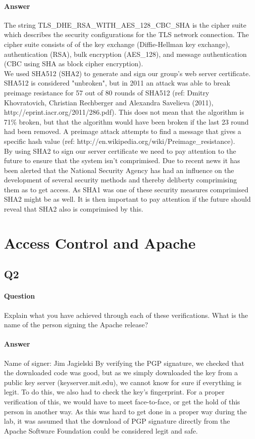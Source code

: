 \documentclass[11pt, a4paper]{article}
\begin{document}
\paragraph{Answer}
The string TLS\_DHE\_RSA\_WITH\_AES\_128\_CBC\_SHA is the cipher suite which describes the security configurations for the TLS network connection. The cipher suite consists of of the key exchange (Diffie-Hellman key exchange), authentication (RSA), bulk encryption (AES\_128), and message authentication (CBC using SHA as block cipher encryption). \\

We used SHA512 (SHA2) to generate and sign our group's web server certificate. SHA512 is considered "unbroken", but in 2011 an attack was able to break preimage resistance  for 57 out of 80 rounds of SHA512 (ref: Dmitry Khovratovich, Christian Rechberger and Alexandra Savelieva (2011), http://eprint.iacr.org/2011/286.pdf). This does not mean that the algorithm is 71\% broken, but that the algorithm would have been broken if the last 23 round had been removed. A preimage attack attempts to find a message that gives a specific hash value (ref: http://en.wikipedia.org/wiki/Preimage\_resistance).\\

By using SHA2 to sign our server certificate we need to pay attention to the future to ensure that the system isn't comprimised. Due to recent news it has been alerted that the National Security Agency has had an influence on the development of several security methods and thereby deliberty comprimising them as to get access. As SHA1 was one of these security measures comprimised SHA2 might be as well. It is then important to pay attention if the future should reveal that SHA2 also is comprimised by this.

\section{Access Control and Apache}
\subsection{Q2}
\paragraph{Question}
Explain what you have achieved through each of these verifications. What is the name
of the person signing the Apache release?
\paragraph{Answer}
Name of signer: Jim Jagielski
By verifying the PGP signature, we checked that the downloaded code was good, but as we simply downloaded the key from a public key server (keyserver.mit.edu), we cannot know for sure if everything is legit. To do this, we also had to check the key's fingerprint. For a proper verification of this, we would have to meet face-to-face, or get the hold of this person in another way. As this was hard to get done in a proper way during the lab, it was assumed that the download of PGP signature directly from the Apache Software Foundation could be considered legit and safe.
\end{document}
